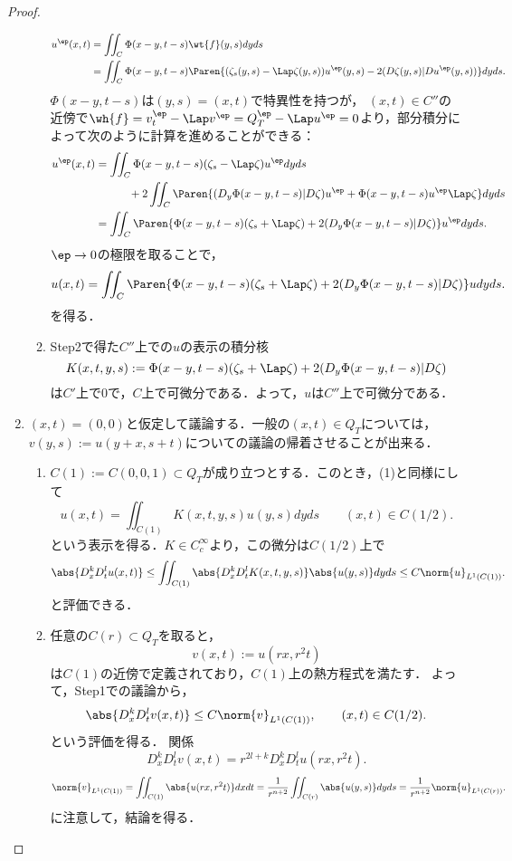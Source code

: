 \documentclass[uplatex,dvipdfmx]{jsarticle}
\begin{document}
\begin{proof}
\begin{enumerate}
\begin{enumerate}[{Step}1]
            \begin{align*}
                u^\ep(x,t)&=\iint_C\Phi(x-y,t-s)\wt{f}(y,s)dyds\\
                &=\iint_C\Phi(x-y,t-s)\Paren{(\zeta_s(y,s)-\Lap\zeta(y,s))u^\ep(y,s)-2(D\zeta(y,s)|Du^\ep(y,s))}dyds.
            \end{align*}
            $\Phi(x-y,t-s)$は$(y,s)=(x,t)$で特異性を持つが，
            $(x,t)\in C''$の近傍で$\wh{f}=v_t^\ep-\Lap v^\ep=Q_T^\ep-\Lap u^\ep=0$より，部分積分によって次のように計算を進めることができる：
            \begin{align*}
                u^\ep(x,t)&=\iint_C\Phi(x-y,t-s)(\zeta_s-\Lap\zeta)u^\ep dyds\\
                &\qquad\quad+2\iint_C\Paren{(D_y\Phi(x-y,t-s)|D\zeta)u^\ep+\Phi(x-y,t-s) u^\ep\Lap\zeta} dyds\\
                &=\iint_C\Paren{\Phi(x-y,t-s)(\zeta_s+\Lap\zeta)+2(D_y\Phi(x-y,t-s)|D\zeta)}u^\ep dyds.
            \end{align*}
            $\ep\to0$の極限を取ることで，
            \[u(x,t)=\iint_C\Paren{\Phi(x-y,t-s)(\zeta_s+\Lap\zeta)+2(D_y\Phi(x-y,t-s)|D\zeta)}u dyds.\]
            を得る．
            \item Step2で得た$C''$上での$u$の表示の積分核
            \[K(x,t,y,s):=\Phi(x-y,t-s)(\zeta_s+\Lap\zeta)+2(D_y\Phi(x-y,t-s)|D\zeta)\]
            は$C'$上で$0$で，$C$上で可微分である．よって，$u$は$C''$上で可微分である．
        \end{enumerate}
        \item $(x,t)=(0,0)$と仮定して議論する．一般の$(x,t)\in Q_T$については，$v(y,s):=u(y+x,s+t)$についての議論の帰着させることが出来る．
        \begin{enumerate}[{Step}1]
            \item $C(1):=C(0,0,1)\subset Q_T$が成り立つとする．このとき，(1)と同様にして
            \[u(x,t)=\iint_{C(1)}K(x,t,y,s)u(y,s)dyds\qquad(x,t)\in C(1/2).\]
            という表示を得る．$K\in C_c^\infty$より，この微分は$C(1/2)$上で
            \[\abs{D_x^kD_t^lu(x,t)}\le\iint_{C(1)}\abs{D_x^kD_t^lK(x,t,y,s)}\abs{u(y,s)}dyds\le C\norm{u}_{L^1(C(1))}.\]
            と評価できる．
            \item 任意の$C(r)\subset Q_T$を取ると，
            \[v(x,t):=u(rx,r^2t)\]
            は$C(1)$の近傍で定義されており，$C(1)$上の熱方程式を満たす．
            よって，Step1での議論から，
            \[\abs{D_x^kD_t^lv(x,t)}\le C\norm{v}_{L^1(C(1))},\qquad (x,t)\in C(1/2).\]
            という評価を得る．
            関係
            \[D_x^kD_t^lv(x,t)=r^{2l+k}D_x^kD_t^lu(rx,r^2t).\]
            \[\norm{v}_{L^1(C(1))}=\iint_{C(1)}\abs{u(rx,r^2t)}dxdt=\frac{1}{r^{n+2}}\iint_{C(r)}\abs{u(y,s)}dyds=\frac{1}{r^{n+2}}\norm{u}_{L^1(C(r))}.\]
            に注意して，結論を得る．
        \end{enumerate}
    \end{enumerate}
\end{proof}



\end{document}
